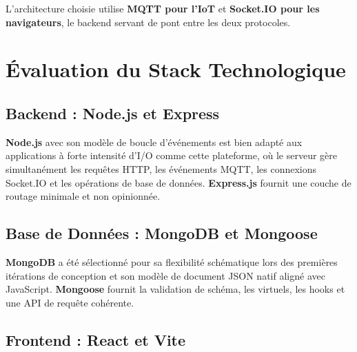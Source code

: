 \noindent L'architecture choisie utilise \textbf{MQTT pour l'IoT} et
\textbf{Socket.IO pour les navigateurs}, le backend servant de pont entre les deux protocoles.

\section{Évaluation du Stack Technologique}

\subsection{Backend : Node.js et Express}

\textbf{Node.js} avec son modèle de boucle d'événements est bien adapté aux applications
à forte intensité d'I/O comme cette plateforme, où le serveur gère simultanément les
requêtes HTTP, les événements MQTT, les connexions Socket.IO et les opérations de base
de données. \textbf{Express.js} fournit une couche de routage minimale et non opinionnée.

\subsection{Base de Données : MongoDB et Mongoose}

\textbf{MongoDB} a été sélectionné pour sa flexibilité schématique lors des premières
itérations de conception et son modèle de document JSON natif aligné avec JavaScript.
\textbf{Mongoose} fournit la validation de schéma, les virtuels, les hooks et une API
de requête cohérente.

\subsection{Frontend : React et Vite}

